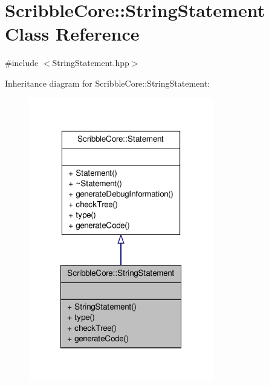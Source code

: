 \hypertarget{class_scribble_core_1_1_string_statement}{\section{Scribble\-Core\-:\-:String\-Statement Class Reference}
\label{class_scribble_core_1_1_string_statement}
}


{\ttfamily \#include $<$String\-Statement.\-hpp$>$}



Inheritance diagram for Scribble\-Core\-:\-:String\-Statement\-:
\nopagebreak
\begin{figure}[H]
\begin{center}
\leavevmode
\includegraphics[width=228pt]{class_scribble_core_1_1_string_statement__inherit__graph}
\end{center}
\end{figure}


